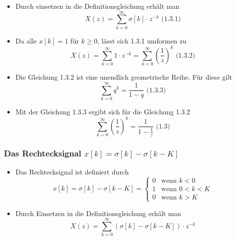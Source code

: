 \documentclass[11pt]{article}
\providecommand{\tightlist}{%
      \setlength{\itemsep}{0pt}\setlength{\parskip}{0pt}}
\def\gt{>}
\def\lt{<}
\begin{document}
    \begin{itemize}
\tightlist
\item
  Durch einsetzen in die Definitionsgleichung erhält man
  \[X(z) = \sum_{k=0}^\infty \sigma[k] \cdot z^{-k}\textrm{  (1.3.1)}\]
\end{itemize}

    \begin{itemize}
\tightlist
\item
  Da alle \(x[k] = 1\) für \(k \geq 0\), lässt sich 1.3.1 umformen zu
  \[X(z) = \sum_{k=0}^\infty 1 \cdot z^{-k} = \sum_{k=0}^\infty (\frac{1}{z})^k \textrm{  (1.3.2)}\]
\end{itemize}

    \begin{itemize}
\tightlist
\item
  Die Gleichung 1.3.2 ist eine unendlich geometrische Reihe. Für diese
  gilt \[\sum_{k=0}^\infty q^k = \frac{1}{1-q} \textrm{  (1.3.3)}\]
\end{itemize}

    \begin{itemize}
\tightlist
\item
  Mit der Gleichung 1.3.3 ergibt sich für die Gleichung 1.3.2
  \[\sum_{k=0}^\infty (\frac{1}{z})^k = \frac{1}{1-\frac{1}{z}} \textrm{  (1.3)}\]
\end{itemize}

    \subsubsection{\texorpdfstring{Das Rechtecksignal
\(x[k] = \sigma[k] - \sigma[k-K]\)}{Das Rechtecksignal x{[}k{]} = \textbackslash{}sigma{[}k{]} - \textbackslash{}sigma{[}k-K{]}}}\label{das-rechtecksignal-xk-sigmak---sigmak-k}

\begin{itemize}
\tightlist
\item
  Das Rechtecksignal ist definiert durch\\
  \[
  \displaystyle x[k] = \sigma[k] - \sigma[k-K] = \begin{cases}
   0 & \text{wenn $k \lt 0$} \\
   1 & \text{wenn $0 \lt k \lt K$} \\ 
   0 & \text{wenn $k \gt K$}
  \end{cases}
  \]
\end{itemize}

    \begin{itemize}
\tightlist
\item
  Durch Einsetzen in die Definitionsgleichung erhält man
  \[X(z) = \sum_{k=0}^\infty (\sigma[k] - \sigma[k-K]) \cdot z^{-k}\]
\end{itemize}
\end{document}
